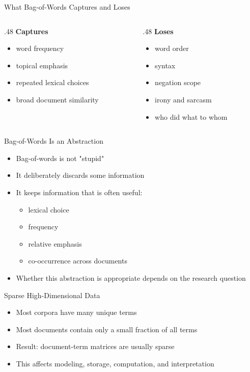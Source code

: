 \documentclass[11pt,aspectratio=43]{beamer}
\begin{document}
\begin{frame}{What Bag-of-Words Captures and Loses}
\begin{columns}[T]
\begin{column}{.48\textwidth}
\textbf{Captures}
\begin{itemize}
\item word frequency
\item topical emphasis
\item repeated lexical choices
\item broad document similarity
\end{itemize}
\end{column}
\begin{column}{.48\textwidth}
\textbf{Loses}
\begin{itemize}
\item word order
\item syntax
\item negation scope
\item irony and sarcasm
\item who did what to whom
\end{itemize}
\end{column}
\end{columns}
\end{frame}

\begin{frame}{Bag-of-Words Is an Abstraction}
\begin{itemize}
\item Bag-of-words is not "stupid"
\item It deliberately discards some information
\item It keeps information that is often useful:
  \begin{itemize}
  \item lexical choice
  \item frequency
  \item relative emphasis
  \item co-occurrence across documents
  \end{itemize}
\item Whether this abstraction is appropriate depends on the research question
\end{itemize}
\end{frame}

\begin{frame}{Sparse High-Dimensional Data}
\begin{itemize}
\item Most corpora have many unique terms
\item Most documents contain only a small fraction of all terms
\item Result: document-term matrices are usually sparse
\item This affects modeling, storage, computation, and interpretation
\end{itemize}
\end{frame}
\end{document}
